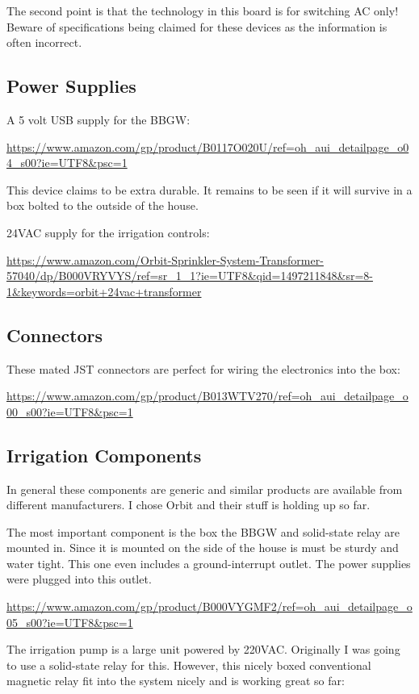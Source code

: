 The second point is that the technology in this board is for switching AC 
only!  Beware of specifications being claimed for these devices as the 
information is often incorrect.

\subsection{Power Supplies}

A 5 volt USB supply for the BBGW:

\url{https://www.amazon.com/gp/product/B0117O020U/ref=oh_aui_detailpage_o04_s00?ie=UTF8&psc=1}

This device claims to be extra durable.  It remains to be seen if it will 
survive in a box bolted to the outside of the house.

24VAC supply for the irrigation controls:

\url{https://www.amazon.com/Orbit-Sprinkler-System-Transformer-57040/dp/B000VRYVYS/ref=sr_1_1?ie=UTF8&qid=1497211848&sr=8-1&keywords=orbit+24vac+transformer}

\subsection{Connectors}

These mated JST connectors are perfect for wiring the electronics into the box:

\url{https://www.amazon.com/gp/product/B013WTV270/ref=oh_aui_detailpage_o00_s00?ie=UTF8&psc=1}

\subsection{Irrigation Components}

In general these components are generic and similar products are available from 
different manufacturers.  I chose Orbit and their stuff is holding up so far.

The most important component is the box the BBGW and solid-state relay are 
mounted in.  Since it is mounted on the side of the house is must be sturdy and 
water tight.  This one even includes a ground-interrupt outlet.  The power 
supplies were plugged into this outlet.

\url{https://www.amazon.com/gp/product/B000VYGMF2/ref=oh_aui_detailpage_o05_s00?ie=UTF8&psc=1}

The irrigation pump is a large unit powered by 220VAC.  Originally I was going 
to use a solid-state relay for this.  However, this nicely boxed conventional 
magnetic relay fit into the system nicely and is working great so far:

